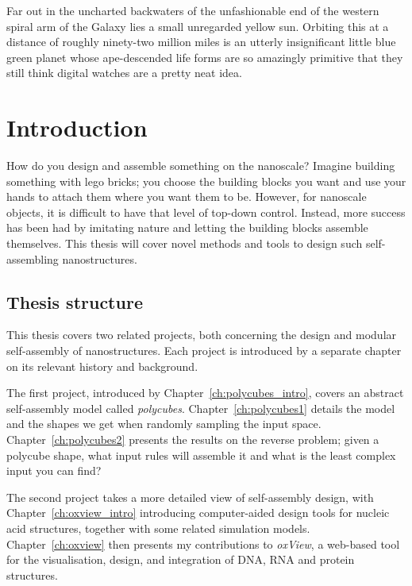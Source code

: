 \begin{savequote}[8cm]
Far out in the uncharted backwaters of the unfashionable end of the western spiral arm of the Galaxy lies a small unregarded yellow sun. Orbiting this at a distance of roughly ninety-two million miles is an utterly insignificant little blue green planet whose ape-descended life forms are so amazingly primitive that they still think digital watches are a pretty neat idea.
\end{savequote}

\chapter{Introduction}\label{ch:1-intro}

\minitoc

How do you design and assemble something on the nanoscale? Imagine building something with lego bricks; you choose the building blocks you want and use your hands to attach them where you want them to be. However, for nanoscale objects, it is difficult to have that level of top-down control. Instead, more success has been had by imitating nature and letting the building blocks assemble themselves. This thesis will cover novel methods and tools to design such self-assembling nanostructures.

\section{Thesis structure}
This thesis covers two related projects, both concerning the design and modular self-assembly of nanostructures. Each project is introduced by a separate chapter on its relevant history and background.

The first project, introduced by Chapter~\ref{ch:polycubes_intro}, covers an abstract self-assembly model called \emph{polycubes}. Chapter~\ref{ch:polycubes1} details the model and the shapes we get when randomly sampling the input space. Chapter~\ref{ch:polycubes2} presents the results on the reverse problem; given a polycube shape, what input rules will assemble it and what is the least complex input you can find?

The second project takes a more detailed view of self-assembly design, with Chapter~\ref{ch:oxview_intro} introducing computer-aided design tools for nucleic acid structures, together with some related simulation models. Chapter~\ref{ch:oxview} then presents my contributions to \emph{oxView}, a web-based tool for the visualisation, design, and integration of DNA, RNA and protein structures.

